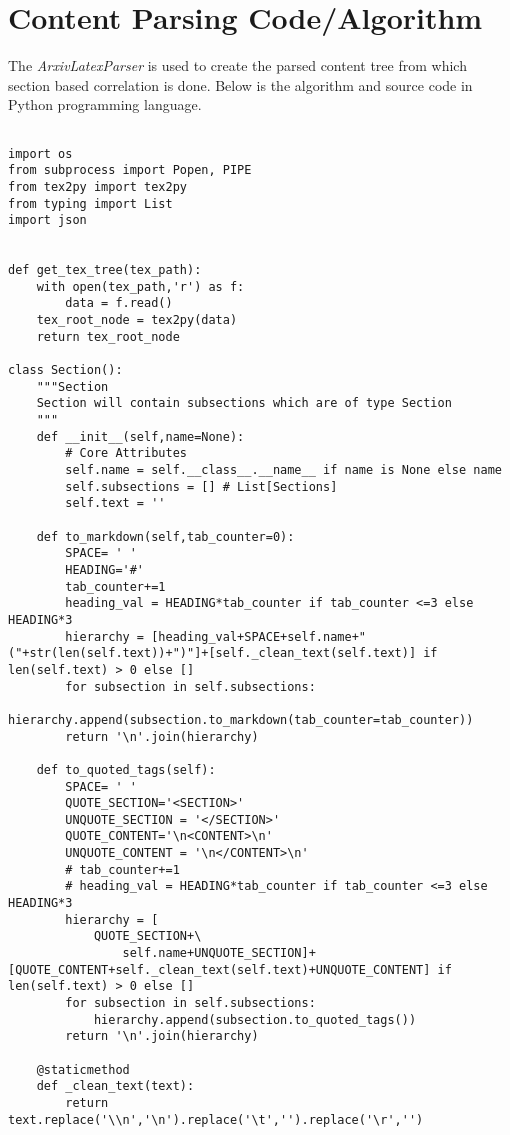 \section{Content Parsing Code/Algorithm}
\label{appendix:content-parsing-code}
The \textit{ArxivLatexParser} is used to create the parsed content tree from which section based correlation is done. Below is the algorithm and source code in Python programming language.
\begin{lstlisting}
  
import os 
from subprocess import Popen, PIPE
from tex2py import tex2py 
from typing import List
import json


def get_tex_tree(tex_path):
    with open(tex_path,'r') as f:
        data = f.read()
    tex_root_node = tex2py(data)
    return tex_root_node

class Section():
    """Section 
    Section will contain subsections which are of type Section
    """
    def __init__(self,name=None):
        # Core Attributes
        self.name = self.__class__.__name__ if name is None else name
        self.subsections = [] # List[Sections]
        self.text = ''
    
    def to_markdown(self,tab_counter=0):
        SPACE= ' '
        HEADING='#'
        tab_counter+=1
        heading_val = HEADING*tab_counter if tab_counter <=3 else HEADING*3
        hierarchy = [heading_val+SPACE+self.name+"("+str(len(self.text))+")"]+[self._clean_text(self.text)] if len(self.text) > 0 else []
        for subsection in self.subsections:
            hierarchy.append(subsection.to_markdown(tab_counter=tab_counter))
        return '\n'.join(hierarchy)
    
    def to_quoted_tags(self):
        SPACE= ' '
        QUOTE_SECTION='<SECTION>'
        UNQUOTE_SECTION = '</SECTION>'
        QUOTE_CONTENT='\n<CONTENT>\n'
        UNQUOTE_CONTENT = '\n</CONTENT>\n'
        # tab_counter+=1
        # heading_val = HEADING*tab_counter if tab_counter <=3 else HEADING*3
        hierarchy = [
            QUOTE_SECTION+\
                self.name+UNQUOTE_SECTION]+[QUOTE_CONTENT+self._clean_text(self.text)+UNQUOTE_CONTENT] if len(self.text) > 0 else []
        for subsection in self.subsections:
            hierarchy.append(subsection.to_quoted_tags())
        return '\n'.join(hierarchy)

    @staticmethod
    def _clean_text(text):
        return text.replace('\\n','\n').replace('\t','').replace('\r','')
    

\end{lstlisting}
